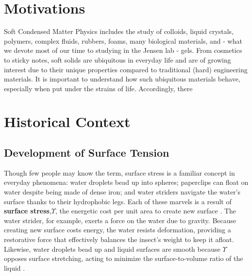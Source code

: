 

\section{Motivations}
Soft Condensed Matter Physics includes the study of colloids, liquid crystals, polymers, complex fluids, rubbers, foams, many biological materials, and - what we devote most of our time to studying in the Jensen lab - gels. From cosmetics to sticky notes, soft solids are ubiquitous in everyday life and are of growing interest due to their unique properties compared to traditional (hard) engineering materials. It is important to understand how such ubiquitous materials behave, especially when put under the strains of life. Accordingly, there 
 
 
 
\section{Historical Context}
\subsection{Development of Surface Tension}
Though few people may know the term, surface stress is a familiar concept in everyday phenomena: water droplets bead up into spheres; paperclips can float on water despite being made of dense iron; and water striders navigate the water's surface thanks to their hydrophobic legs. Each of these marvels is a result of \textbf{surface stress},$\Upsilon$, the  energetic cost per unit area to create new surface \cite{cammarata1994surface}. The water strider, for example, exerts a force on the water due to gravity. Because creating new surface costs energy, the water resists deformation, providing a restorative force that effectively balances the insect’s weight to keep it afloat. Likewise, water droplets bead up and liquid surfaces are smooth because $\Upsilon$ opposes surface stretching, acting to minimize the surface-to-volume ratio of the liquid \cite{gibbs1906scientific,GennesPierre-Gillesde2003Cawp} .


